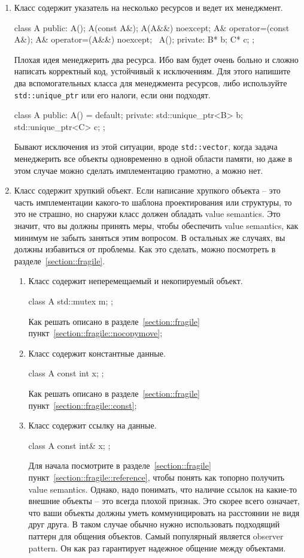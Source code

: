 \begin{enumerate}
\item Класс содержит указатель на несколько ресурсов и ведет их менеджмент.
\begin{cppcode}
class A {
public:
  A();
  A(const A&);
  A(A&&) noexcept;
  A& operator=(const A&);
  A& operator=(A&&) noexcept;
  ~A();
private:
  B* b;
  C* c;
};
\end{cppcode}
Плохая идея менеджерить два ресурса.
Ибо вам будет очень больно и сложно написать корректный код, устойчивый к исключениям.
Для этого напишите два вспомогательных класса для менеджмента ресурсов, либо используйте \verb"std::unique_ptr" или его налоги, если они подходят.
\begin{cppcode}
class A {
public:
  A() = default;
private:
  std::unique_ptr<B> b;
  std::unique_ptr<C> c;
};
\end{cppcode}
Бывают исключения из этой ситуации, вроде \verb"std::vector", когда задача менеджерить все объекты одновременно в одной области памяти, но даже в этом случае можно сделать имплементацию грамотно, а можно нет.%

\item Класс содержит хрупкий объект.
Если написание хрупкого объекта -- это часть имплементации какого-то шаблона проектирования или структуры, то это не страшно, но снаружи класс должен обладать value semantics.
Это значит, что вы должны принять меры, чтобы обеспечить value semantics, как минимум не забыть заняться этим вопросом.
В остальных же случаях, вы должны избавиться от проблемы.
Как это сделать, можно посмотреть в разделе~\ref{section::fragile}.
\begin{enumerate}
\item Класс содержит неперемещаемый и некопируемый объект.
\begin{cppcode}
class A {
  std::mutex m;
};
\end{cppcode}
Как решать описано в разделе~\ref{section::fragile} пункт~\ref{section::fragile::nocopymove};

\item Класс содержит константные данные.
\begin{cppcode}
class A {
  const int x;
};
\end{cppcode}
Как решать описано в разделе~\ref{section::fragile} пункт~\ref{section::fragile::const};

\item Класс содержит ссылку на данные.
\begin{cppcode}
class A {
  const int& x;
};
\end{cppcode}
Для начала посмотрите в разделе~\ref{section::fragile} пункт~\ref{section::fragile::reference}, чтобы понять как топорно получить value semantics.
Однако, надо понимать, что наличие ссылок на какие-то внешние объекты -- это всегда плохой признак.
Это скорее всего означает, что ваши объекты должны уметь коммуницировать на расстоянии не видя друг друга.
В таком случае обычно нужно использовать подходящий паттерн для общения объектов.
Самый популярный является observer pattern.
Он как раз гарантирует надежное общение между объектами.
\end{enumerate}


\end{enumerate}
